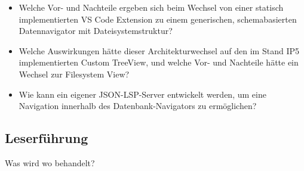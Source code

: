 \begin{itemize}
  \item Welche Vor- und Nachteile ergeben sich beim Wechsel von einer statisch implementierten VS Code Extension zu einem generischen, schemabasierten Datennavigator mit Dateisystemstruktur? 
  
\vspace{0.5em}

  \item Welche Auswirkungen hätte dieser Architekturwechsel auf den im Stand IP5 implementierten Custom TreeView, und welche Vor- und Nachteile hätte ein Wechsel zur Filesystem View?

    \vspace{0.5em}
  
  \item Wie kann ein eigener JSON-LSP-Server entwickelt werden, um eine Navigation innerhalb des Datenbank-Navigators zu ermöglichen?
\end{itemize}



\subsection{Leserführung}
Was wird wo behandelt?
